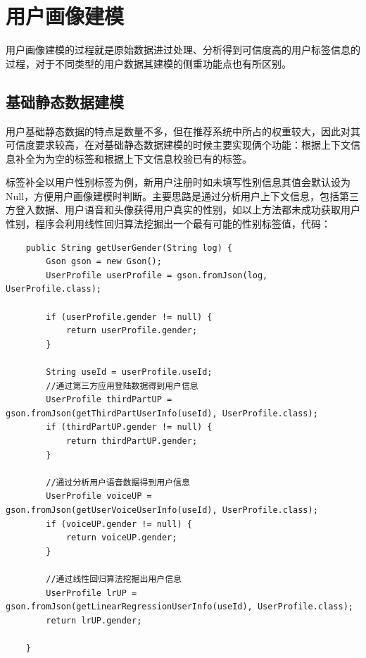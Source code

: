   \section{用户画像建模}
  用户画像建模的过程就是原始数据进过处理、分析得到可信度高的用户标签信息的过程，对于不同类型的用户数据其建模的侧重功能点也有所区别。
  \subsection{基础静态数据建模}
  用户基础静态数据的特点是数量不多，但在推荐系统中所占的权重较大，因此对其可信度要求较高，在对基础静态数据建模的时候主要实现俩个功能：根据上下文信息补全为为空的标签和根据上下文信息校验已有的标签。

  标签补全以用户性别标签为例，新用户注册时如未填写性别信息其值会默认设为Null，方便用户画像建模时判断。主要思路是通过分析用户上下文信息，包括第三方登入数据、用户语音和头像获得用户真实的性别，如以上方法都未成功获取用户性别，程序会利用线性回归算法挖掘出一个最有可能的性别标签值，代码：
  \begin{lstlisting}
    public String getUserGender(String log) {
        Gson gson = new Gson();
        UserProfile userProfile = gson.fromJson(log, UserProfile.class);

        if (userProfile.gender != null) {
            return userProfile.gender;
        }

        String useId = userProfile.useId;
        //通过第三方应用登陆数据得到用户信息
        UserProfile thirdPartUP = gson.fromJson(getThirdPartUserInfo(useId), UserProfile.class);
        if (thirdPartUP.gender != null) {
            return thirdPartUP.gender;
        }

        //通过分析用户语音数据得到用户信息
        UserProfile voiceUP = gson.fromJson(getUserVoiceUserInfo(useId), UserProfile.class);
        if (voiceUP.gender != null) {
            return voiceUP.gender;
        }

        //通过线性回归算法挖掘出用户信息
        UserProfile lrUP = gson.fromJson(getLinearRegressionUserInfo(useId), UserProfile.class);
        return lrUP.gender;

    }
  \end{lstlisting}

